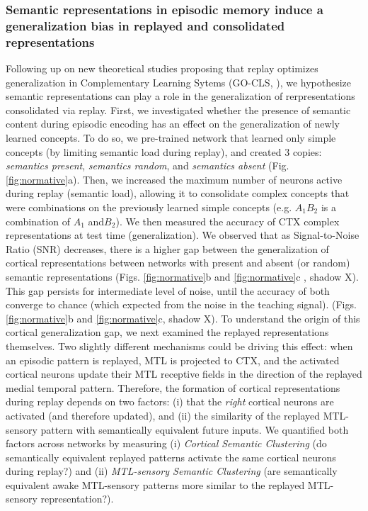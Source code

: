 \documentclass{article}
\begin{document}
\subsubsection*{Semantic representations in episodic memory induce a generalization bias in replayed and consolidated representations}
Following up on new theoretical studies proposing that replay optimizes generalization in Complementary Learning Sytems (GO-CLS, ), we hypothesize semantic representations can play a role in the generalization of rerpresentations consolidated via replay.
\newline\newline
First, we investigated whether the presence of semantic content during episodic encoding has an effect on the generalization of newly learned concepts. To do so, we pre-trained network that learned only simple concepts (by limiting semantic load during replay), and created 3 copies: \textit{semantics present}, \textit{semantics random}, and \textit{semantics absent} (Fig. \ref{fig:normative}a). Then, we increased the maximum number of neurons active during replay (semantic load), allowing it to consolidate complex concepts that were combinations on the previously learned simple concepts (e.g. $A_1B_2$ is a combination of $A_1$ and$B_2$). We then measured the accuracy of CTX complex representations at test time (generalization).  We observed that as Signal-to-Noise Ratio (SNR) decreases, there is a higher gap between the generalization of cortical representations between networks with present and absent (or random) semantic representations (Figs. \ref{fig:normative}b and \ref{fig:normative}c , shadow X). This gap persists for intermediate level of noise, until the accuracy of both converge to chance (which expected from the noise in the teaching signal). (Figs. \ref{fig:normative}b and \ref{fig:normative}c, shadow X).
\newline\newline
To understand the origin of this cortical generalization gap, we next examined the replayed representations themselves. Two slightly different mechanisms could be driving this effect: when an episodic pattern is replayed, MTL is projected to CTX, and the activated cortical neurons update their MTL receptive fields in the direction of the replayed medial temporal pattern. Therefore, the formation of cortical representations during replay depends on two factors: (i) that the \textit{right} cortical neurons are activated (and therefore updated), and (ii) the similarity of the replayed MTL-sensory pattern with semantically equivalent future inputs. We quantified both factors across networks by measuring (i) \textit{Cortical Semantic Clustering} (do semantically equivalent replayed patterns activate the same cortical neurons during replay?) and (ii) \textit{MTL-sensory Semantic Clustering} (are semantically equivalent awake MTL-sensory patterns more similar to the replayed MTL-sensory representation?).
\end{document}
